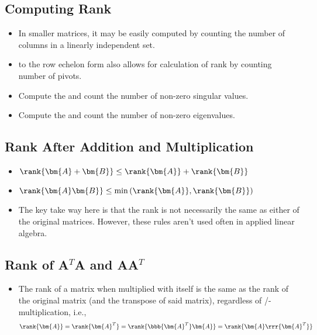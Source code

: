\begin{itemize}
    
    \subsection{Computing Rank}\label{Computing Rank}
    \begin{itemize}
      \item In smaller matrices, it may be easily computed by counting the number of columns in a linearly independent set.
      \item \hyperref[Row Echelon form]{} to the row echelon form also allows for calculation of rank by counting number of pivots.
      \item Compute the \hyperref[tbd]{} and count the number of non-zero singular values.
      \item Compute the \hyperref[tbd]{} and count the number of non-zero eigenvalues.
    \end{itemize}
    
    \subsection{Rank After Addition and Multiplication}\label{Rank After Addition and Multiplication}
    \begin{itemize}
      \item \(\rank{\bm{A}+\bm{B}} \leq \rank{\bm{A}} + \rank{\bm{B}} \)
      \item \(\rank{\bm{A}\bm{B}} \leq \min{(\rank{\bm{A}},\rank{\bm{B}})} \)
      \item The key take way here is that the rank is not necessarily the same as either of the original matrices. However, these rules aren't used often in applied linear algebra.
    \end{itemize}

    \subsection{Rank of A\texorpdfstring{\(^T\)}{}A and AA\texorpdfstring{\(^T\)}{}}\label{Rank of ATA and AAT}
    \begin{itemize}
      \item The rank of a matrix when multiplied with itself is the same as the rank of the original matrix (and the transpose of said matrix), regardless of /-multiplication, i.e.,
      \[%
      \rank{\bm{A}}  = \rank{\bm{A}^T} = \rank{\bbb{\bm{A}^T}\bm{A}} = \rank{\bm{A}\rrr{\bm{A}^T}}
      \]%


\end{itemize}
\end{itemize}
